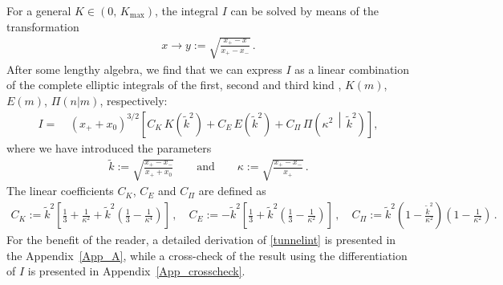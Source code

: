 \documentclass[aps,nofootinbib,prd,superscriptaddress,eqsecnum,showpacs,showkeys,preprintnumbers,altaffilletter]{revtex4}
\newcommand{\Kmax}{K_\text{max}}
\newcommand{\kn}{\kappa}
\begin{document}
For a general $K\in(0,\,\Kmax)$, the integral $I$ can be solved by means of the transformation 
\begin{align}
	x\rightarrow y := \sqrt{\frac{x_+ - x}{x_+ - x_-}}\,.
\end{align}
After some lengthy algebra, we find that we can express $I$ as a linear combination of the complete elliptic integrals of the first, second and third kind \cite{abra}, $K(m)$, $E(m)$, $\Pi(n|m)$, respectively:
\begin{align}
	 \label{tunnelint}
	I 
	=&~  \left(x_+ + x_0\right)^{3/2}
	\left[
		 C_K\, K\left(\tilde{k}^2\right) 
		 + C_E\, E\left(\tilde{k}^2\right) 
		 + C_\Pi \, \Pi\left(\kappa^2\,\middle|\,\tilde{k}^2\right)
	\right],
\end{align}
where  we have introduced the parameters
\begin{align}
	\tilde{k}:=\sqrt{\frac{x_+ - x_-}{x_+ + x_0}}
	\qquad
	\textrm{and}
	\qquad
	\kn := \sqrt{\frac{x_+ - x_-}{x_+}}
	\,.
\end{align}
The linear coefficients $C_K$, $C_E$ and $C_\Pi$ are defined as
\begin{align}
	C_K := \tilde{k}^2\left[
		\frac{1}{3}+\frac{1}{\kappa^2} 
		+ \tilde{k}^2\left(\frac{1}{3}-\frac{1}{\kappa^4}\right)
	\right]
	\,,
	\quad
	C_E := - \tilde{k}^2\left[
		\frac{1}{3}
		+ \tilde{k}^2\left(\frac{1}{3} - \frac{1}{\kappa^2} \right)
	\right]
	\,,
	\quad
	C_\Pi := \tilde{k}^2\left( 1- \frac{\tilde{k}^2}{\kappa^2}\right)\left( 1- \frac{1}{\kappa^2}\right)
	\,.
\end{align}
For the benefit of the reader, a detailed derivation of \eqref{tunnelint} is presented in the Appendix~\ref{App_A}, while a cross-check of the result using the differentiation of $I$ is presented in Appendix~\ref{App_crosscheck}.
\end{document}
